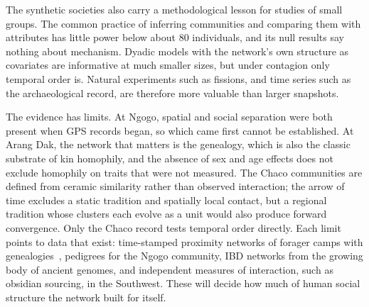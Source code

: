 \documentclass[11pt]{article}
\begin{document}
The synthetic societies also carry a methodological lesson for studies of small groups. The common
practice of inferring communities and comparing them with attributes has little power below about 80
individuals, and its null results say nothing about mechanism. Dyadic models with the network's own
structure as covariates are informative at much smaller sizes, but under contagion only temporal order
is. Natural experiments such as fissions, and time series such as the archaeological record, are
therefore more valuable than larger snapshots.

The evidence has limits. At Ngogo, spatial and social separation were both present when GPS records
began, so which came first cannot be established. At Arang Dak, the network that matters is the
genealogy, which is also the classic substrate of kin homophily, and the absence of sex and age effects
does not exclude homophily on traits that were not measured. The Chaco communities are defined from
ceramic similarity rather than observed interaction; the arrow of time excludes a static tradition and
spatially local contact, but a regional tradition whose clusters each evolve as a unit would also produce
forward convergence. Only the Chaco record tests temporal order directly. Each limit points to data that
exist: time-stamped proximity networks of forager camps with genealogies~\cite{Migliano2017,Dyble2015},
pedigrees for the Ngogo community, IBD networks from the growing body of ancient genomes, and independent
measures of interaction, such as obsidian sourcing, in the Southwest. These will decide how much of human
social structure the network built for itself.
\end{document}
